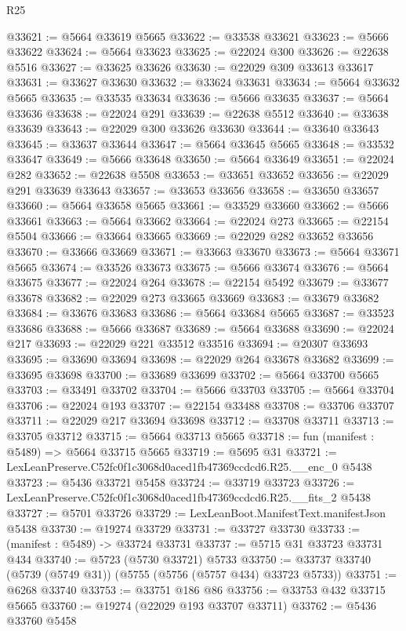 \begin{lexlean}{R25}
\begin{coremodule}
@33621 := @5664 @33619 @5665
@33622 := @33538 @33621
@33623 := @5666 @33622
@33624 := @5664 @33623
@33625 := @22024 @300
@33626 := @22638 @5516
@33627 := @33625 @33626
@33630 := @22029 @309 @33613 @33617
@33631 := @33627 @33630
@33632 := @33624 @33631
@33634 := @5664 @33632 @5665
@33635 := @33535 @33634
@33636 := @5666 @33635
@33637 := @5664 @33636
@33638 := @22024 @291
@33639 := @22638 @5512
@33640 := @33638 @33639
@33643 := @22029 @300 @33626 @33630
@33644 := @33640 @33643
@33645 := @33637 @33644
@33647 := @5664 @33645 @5665
@33648 := @33532 @33647
@33649 := @5666 @33648
@33650 := @5664 @33649
@33651 := @22024 @282
@33652 := @22638 @5508
@33653 := @33651 @33652
@33656 := @22029 @291 @33639 @33643
@33657 := @33653 @33656
@33658 := @33650 @33657
@33660 := @5664 @33658 @5665
@33661 := @33529 @33660
@33662 := @5666 @33661
@33663 := @5664 @33662
@33664 := @22024 @273
@33665 := @22154 @5504
@33666 := @33664 @33665
@33669 := @22029 @282 @33652 @33656
@33670 := @33666 @33669
@33671 := @33663 @33670
@33673 := @5664 @33671 @5665
@33674 := @33526 @33673
@33675 := @5666 @33674
@33676 := @5664 @33675
@33677 := @22024 @264
@33678 := @22154 @5492
@33679 := @33677 @33678
@33682 := @22029 @273 @33665 @33669
@33683 := @33679 @33682
@33684 := @33676 @33683
@33686 := @5664 @33684 @5665
@33687 := @33523 @33686
@33688 := @5666 @33687
@33689 := @5664 @33688
@33690 := @22024 @217
@33693 := @22029 @221 @33512 @33516
@33694 := @20307 @33693
@33695 := @33690 @33694
@33698 := @22029 @264 @33678 @33682
@33699 := @33695 @33698
@33700 := @33689 @33699
@33702 := @5664 @33700 @5665
@33703 := @33491 @33702
@33704 := @5666 @33703
@33705 := @5664 @33704
@33706 := @22024 @193
@33707 := @22154 @33488
@33708 := @33706 @33707
@33711 := @22029 @217 @33694 @33698
@33712 := @33708 @33711
@33713 := @33705 @33712
@33715 := @5664 @33713 @5665
@33718 := fun (manifest : @5489) => @5664 @33715 @5665
@33719 := @5695 @31
@33721 := LexLeanPreserve.C52fc0f1c3068d0aced1fb47369ccdcd6.R25.__enc_0 @5438
@33723 := @5436 @33721 @5458
@33724 := @33719 @33723
@33726 := LexLeanPreserve.C52fc0f1c3068d0aced1fb47369ccdcd6.R25.__fits_2 @5438
@33727 := @5701 @33726
@33729 := LexLeanBoot.ManifestText.manifestJson @5438
@33730 := @19274 @33729
@33731 := @33727 @33730
@33733 := (manifest : @5489) -> @33724 @33731
@33737 := @5715 @31 @33723 @33731 @434
@33740 := @5723 (@5730 @33721) @5733
@33750 := @33737 @33740 (@5739 (@5749 @31)) (@5755 (@5756 (@5757 @434) @33723 @5733))
@33751 := @6268 @33740
@33753 := @33751 @186 @86
@33756 := @33753 @432 @33715 @5665
@33760 := @19274 (@22029 @193 @33707 @33711)
@33762 := @5436 @33760 @5458

\end{coremodule}
\end{lexlean}
